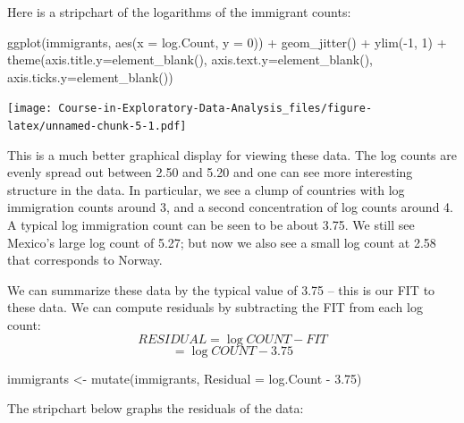 \documentclass[
]{book}
\newenvironment{Shaded}{\begin{snugshade}}{\end{snugshade}}
\newcommand{\AttributeTok}[1]{\textcolor[rgb]{0.77,0.63,0.00}{#1}}
\newcommand{\DecValTok}[1]{\textcolor[rgb]{0.00,0.00,0.81}{#1}}
\newcommand{\FloatTok}[1]{\textcolor[rgb]{0.00,0.00,0.81}{#1}}
\newcommand{\FunctionTok}[1]{\textcolor[rgb]{0.00,0.00,0.00}{#1}}
\newcommand{\NormalTok}[1]{#1}
\newcommand{\OtherTok}[1]{\textcolor[rgb]{0.56,0.35,0.01}{#1}}
\newcommand{\SpecialCharTok}[1]{\textcolor[rgb]{0.00,0.00,0.00}{#1}}
\begin{document}
Here is a stripchart of the logarithms of the immigrant counts:

\begin{Shaded}
\begin{Highlighting}[]
\FunctionTok{ggplot}\NormalTok{(immigrants,}
       \FunctionTok{aes}\NormalTok{(}\AttributeTok{x =}\NormalTok{ log.Count, }\AttributeTok{y =} \DecValTok{0}\NormalTok{)) }\SpecialCharTok{+}
     \FunctionTok{geom\_jitter}\NormalTok{() }\SpecialCharTok{+} \FunctionTok{ylim}\NormalTok{(}\SpecialCharTok{{-}}\DecValTok{1}\NormalTok{, }\DecValTok{1}\NormalTok{) }\SpecialCharTok{+}
     \FunctionTok{theme}\NormalTok{(}\AttributeTok{axis.title.y=}\FunctionTok{element\_blank}\NormalTok{(),}
     \AttributeTok{axis.text.y=}\FunctionTok{element\_blank}\NormalTok{(),}
     \AttributeTok{axis.ticks.y=}\FunctionTok{element\_blank}\NormalTok{())}
\end{Highlighting}
\end{Shaded}

\texttt{[image: Course-in-Exploratory-Data-Analysis\_files/figure-latex/unnamed-chunk-5-1.pdf]}

This is a much better graphical display for viewing these data. The log counts are evenly spread out between 2.50 and 5.20 and one can see more interesting structure in the data. In particular, we see a clump of countries with log immigration counts around 3, and a second concentration of log counts around 4. A typical log immigration count can be seen to be about 3.75. We still see Mexico's large log count of 5.27; but now we also see a small log count at 2.58 that corresponds to Norway.

We can summarize these data by the typical value of 3.75 -- this is our FIT to these data. We can compute residuals by subtracting the FIT from each log count:
\[
RESIDUAL = \log COUNT - FIT
\]
\[
= \log COUNT - 3.75
\]

\begin{Shaded}
\begin{Highlighting}[]
\NormalTok{immigrants }\OtherTok{\textless{}{-}} \FunctionTok{mutate}\NormalTok{(immigrants,}
              \AttributeTok{Residual =}\NormalTok{ log.Count }\SpecialCharTok{{-}} \FloatTok{3.75}\NormalTok{)}
\end{Highlighting}
\end{Shaded}

The stripchart below graphs the residuals of the data:
\end{document}
